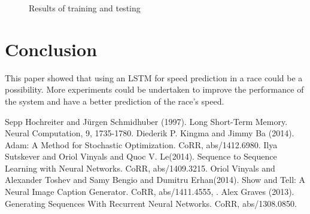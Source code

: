 \documentclass[a4paper, 10pt, conference]{ieeeconf}      %
\begin{document}
\begin{figure}[thpb]
  \centering
  \caption{Results of training and testing}
  \label{fig:score-lstm}
\end{figure}

\section{Conclusion}

This paper showed that using an LSTM for speed prediction in a race could be a possibility. More experiments could be undertaken to improve the performance of the system and have a better prediction of the race's speed.

\addtolength{\textheight}{-12cm}   %

\begin{thebibliography}{99}

 Sepp Hochreiter and Jürgen Schmidhuber (1997). Long Short-Term Memory. Neural Computation, 9, 1735-1780.
 Diederik P. Kingma and Jimmy Ba (2014). Adam: A Method for Stochastic Optimization. CoRR, abs/1412.6980.
 Ilya Sutskever and Oriol Vinyals and Quoc V. Le(2014). Sequence to Sequence Learning with Neural Networks. CoRR, abs/1409.3215.
 Oriol Vinyals and Alexander Toshev and Samy Bengio and Dumitru Erhan(2014). Show and Tell: A Neural Image Caption Generator. CoRR, abs/1411.4555, .
 Alex Graves (2013). Generating Sequences With Recurrent Neural Networks. CoRR, abs/1308.0850.
\end{thebibliography}

\end{document}
